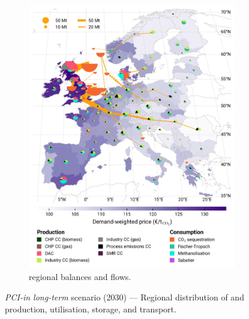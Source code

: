 \documentclass[preprint,12pt,sort&compress]{elsarticle}
\begin{document}
\begin{figure}[htbp]
\begin{subfigure}[t]{0.49\textwidth}
      \includegraphics[width=1\textwidth]{maps/pcipmi-national-international-expansion/base_s_adm___2050-balance_map_co2_stored} 
      \vspace{-0.7cm}
      \caption{ regional balances and flows.}
      \label{fig:PCI-in_lt_2030_co2}
  \end{subfigure}
  \caption{\textit{PCI-in long-term} scenario (2030) --- Regional distribution of  and  production, utilisation, storage, and transport.}
  \label{fig:PCI-in_lt_2030}
\end{figure}
\end{document}
